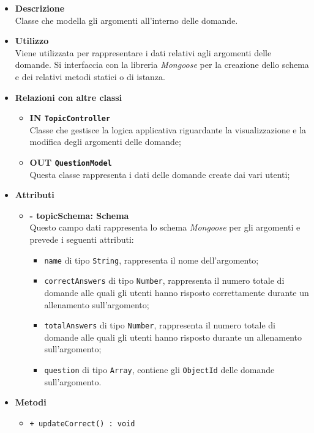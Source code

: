 \begin{itemize}
	\item \textbf{Descrizione} \\
	Classe che modella gli argomenti all'interno delle domande.
	\item \textbf{Utilizzo} \\
	Viene utilizzata per rappresentare i dati relativi agli argomenti delle domande. Si interfaccia con la libreria \textit{Mongoose} per la creazione dello schema e dei relativi metodi statici o di istanza.
	\item \textbf{Relazioni con altre classi}
		\begin{itemize}
			\item \textbf{IN \texttt{TopicController}} \\
			Classe che gestisce la logica applicativa riguardante la visualizzazione e la modifica degli argomenti delle domande;
			\item \textbf{OUT \texttt{QuestionModel}} \\
			Questa classe rappresenta i dati delle domande create dai vari utenti;
		\end{itemize}
	\item \textbf{Attributi}
		\begin{itemize}
			\item \textbf{- topicSchema: Schema} \\
			Questo campo dati rappresenta lo schema \textit{Mongoose} per gli argomenti e prevede i seguenti attributi:
				\begin{itemize}
					\item \texttt{name} di tipo \texttt{String}, rappresenta il nome dell'argomento;
					\item \texttt{correctAnswers} di tipo \texttt{Number}, rappresenta il numero totale di domande alle quali gli utenti hanno risposto correttamente durante un allenamento sull'argomento; 
					\item \texttt{totalAnswers} di tipo \texttt{Number}, rappresenta il numero totale di domande alle quali gli utenti hanno risposto durante un allenamento sull'argomento;
					\item \texttt{question} di tipo \texttt{Array}, contiene gli \texttt{ObjectId} delle domande sull'argomento.
				\end{itemize}
		\end{itemize}
	\item \textbf{Metodi}
		\begin{itemize}
			\item \texttt{+ updateCorrect() : void} \\

\end{itemize}
\end{itemize}
